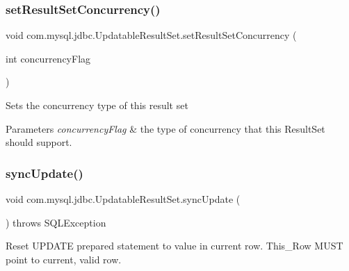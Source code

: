 \subsubsection{\texorpdfstring{set\+Result\+Set\+Concurrency()}{setResultSetConcurrency()}}
{\footnotesize\ttfamily void com.\+mysql.\+jdbc.\+Updatable\+Result\+Set.\+set\+Result\+Set\+Concurrency (\begin{DoxyParamCaption}\item[{int}]{concurrency\+Flag }\end{DoxyParamCaption})\hspace{0.3cm}{\ttfamily [protected]}}

Sets the concurrency type of this result set


\begin{DoxyParams}{Parameters}
{\em concurrency\+Flag} & the type of concurrency that this Result\+Set should support. \\
\hline
\end{DoxyParams}
\mbox{\label{classcom_1_1mysql_1_1jdbc_1_1_updatable_result_set_a8504fb4ab23940b812d45b460a44318d}} 
\subsubsection{\texorpdfstring{sync\+Update()}{syncUpdate()}}
{\footnotesize\ttfamily void com.\+mysql.\+jdbc.\+Updatable\+Result\+Set.\+sync\+Update (\begin{DoxyParamCaption}{ }\end{DoxyParamCaption}) throws S\+Q\+L\+Exception\hspace{0.3cm}{\ttfamily [protected]}}

Reset U\+P\+D\+A\+TE prepared statement to value in current row. This\+\_\+\+Row M\+U\+ST point to current, valid row.


